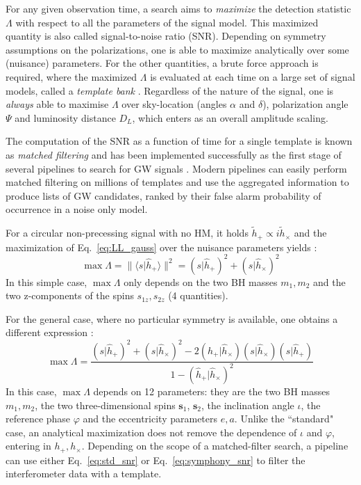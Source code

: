 \documentclass[twocolumn,showpacs,preprintnumbers,nofootinbib,prd,
superscriptaddress,10pt]{revtex4-2}
\newcommand{\scalar}[2]{\langle #1|#2 \rangle}
\newcommand{\rescalar}[2]{( #1 |#2 )}
\begin{document}
For any given observation time, a search aims to {\it maximize} the detection statistic $\Lambda$ with respect to all the parameters of the signal model. This maximized quantity is also called signal-to-noise ratio (SNR).
Depending on symmetry assumptions on the polarizations, one is able to maximize analytically over some (nuisance) parameters.
For the other quantities, a brute force approach is required, where the maximized $\Lambda$ is evaluated at each time on a large set of signal models, called a {\it template bank} \cite{PhysRevD.77.104017, Mukherjee:2018yra}.
Regardless of the nature of the signal, one is {\it always} able to maximise $\Lambda$ over sky-location (angles $\alpha$ and $\delta$), polarization angle $\Psi$ and luminosity distance $D_L$, which enters as an overall amplitude scaling.

The computation of the SNR as a function of time for a single template is known as {\it matched filtering} and has been implemented successfully as the first stage of several pipelines to search for GW signals \cite{Allen:2005fk, Privitera:2013xza, Usman:2015kfa, Capano:2016dsf, PhysRevD.95.042001, Nitz:2017svb, Sachdev:2019vvd, Aubin:2020goo, Chu:2020pjv}. Modern pipelines can easily perform matched filtering on millions of templates and use the aggregated information to produce lists of GW candidates, ranked by their false alarm probability of occurrence in a noise only model.

For a circular non-precessing signal with no HM, it holds $\tilde{h}_+ \propto i\tilde{h}_\times$ and the maximization of Eq.~\eqref{eq:LL_gauss} over the nuisance parameters yields \cite{Maggiore:2007ulw}:
\begin{equation}\label{eq:std_snr}
	\max \Lambda = \lVert \scalar{s}{\hat{h}_+} \rVert^2 = \rescalar{s}{\hat{h}_+}^2 + \rescalar{s}{\hat{h}_\times}^2
\end{equation}
In this simple case, $\max\Lambda$ only depends on the two BH masses $m_1, m_2$ and the two z-components of the spins $s_{1z}, s_{2z}$ (4 quantities).

For the general case, where no particular symmetry is available, one obtains a different expression \cite{Capano:2013raa, Schmidt:2014iyl, Harry:2017weg}:
\begin{equation}\label{eq:symphony_snr}
	\max \Lambda = \frac{ \rescalar{s}{\hat{h}_+}^2 + \rescalar{s}{\hat{h}_\times}^2 -2\rescalar{\hat{h}_+}{\hat{h}_\times}\rescalar{s}{\hat{h}_\times}\rescalar{s}{\hat{h}_+}}{1- \rescalar{\hat{h}_+}{\hat{h}_\times}^2}
\end{equation}
In this case, $\max\Lambda$ depends on 12 parameters: they are the two BH masses $m_1, m_2$, the two three-dimensional spins $\mathbf{s}_1$, $\mathbf{s}_2$, the inclination angle $\iota$, the reference phase $\varphi$ and the eccentricity parameters $e, a$.
Unlike the ``standard" case, an analytical maximization does not remove the dependence of $\iota$ and $\varphi$, entering in $h_+, h_\times$.
%
Depending on the scope of a matched-filter search, a pipeline can use either Eq.~\eqref{eq:std_snr} or Eq.~\eqref{eq:symphony_snr} to filter the interferometer data with a template.
\end{document}
